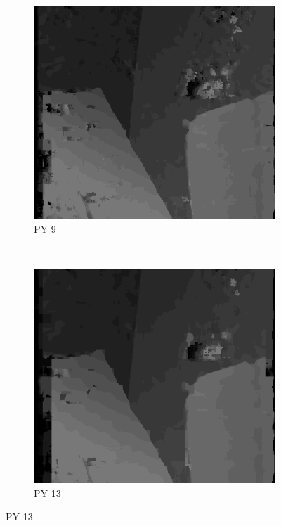 \begin{figure}
  \begin{subfigure}[b]{0.23\textwidth}
    \centering
    \includegraphics[width=\textwidth]{images/stereo-pairs/venus_pyramid_9.png}
    \caption{PY 9}
  \end{subfigure}
  ~
  \begin{subfigure}[b]{0.23\textwidth}
    \centering
    \includegraphics[width=\textwidth]{images/stereo-pairs/venus_pyramid_13.png}
    \caption{PY 13}

\end{subfigure}
\end{figure}
